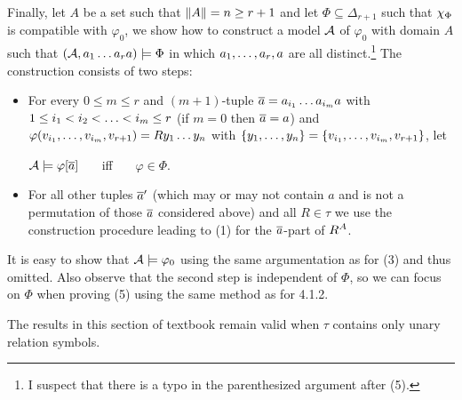 \begin{enumerate}[1.]
Finally, let $A$ be a set such that $\|A\| = n \geq r + 1$ and let $\Phi \subseteq \Delta_{r + 1}$ such that $\extaxm[\Phi]$ is compatible with $\varphi_0$, we show how to construct a model $\mathcal{A}$ of $\varphi_0$ with domain $A$ such that $(\mathcal{A}, a_1 \ldots a_ra) \models \Phi$ in which $a_1, \ldots, a_r, a$ are all distinct.\footnote{I suspect that there is a typo in the parenthesized argument after (5).} The construction consists of two steps:
\begin{itemize}
\item For every $0 \leq m \leq r$ and $(m + 1)$-tuple $\overline{a} = a_{i_1} \ldots a_{i_m}a$ with $1 \leq i_1 < i_2 < \ldots < i_m \leq r$ (if $m = 0$ then $\overline{a} = a$) and $\varphi(v_{i_1}, \ldots, v_{i_m}, v_{r + 1}) = Ry_1 \ldots y_n$ with ${\{y_1, \ldots, y_n\}} = {\{v_{i_1}, \ldots, v_{i_m}, v_{r + 1}\}}$, let
\begin{center}
$\mathcal{A} \models \varphi [\overline{a}]$ \ \ \ iff \ \ \ $\varphi \in \Phi$.
\end{center}
\item For all other tuples $\overline{a}'$ (which may or may not contain $a$ and is not a permutation of those $\overline{a}$ considered above) and all $R \in \tau$ we use the construction procedure leading to (1) for the $\overline{a}$-part of $R^{A}$.
\end{itemize}
It is easy to show that $\mathcal{A} \models \varphi_0$ using the same argumentation as for (3) and thus omitted. Also observe that the second step is independent of $\Phi$, so we can focus on $\Phi$ when proving (5) using the same method as for 4.1.2.

\begin{remark}
The results in this section of textbook remain valid when $\tau$ contains only unary relation symbols.
\end{remark}
%
\end{enumerate}


\setcounter{section}{2}
